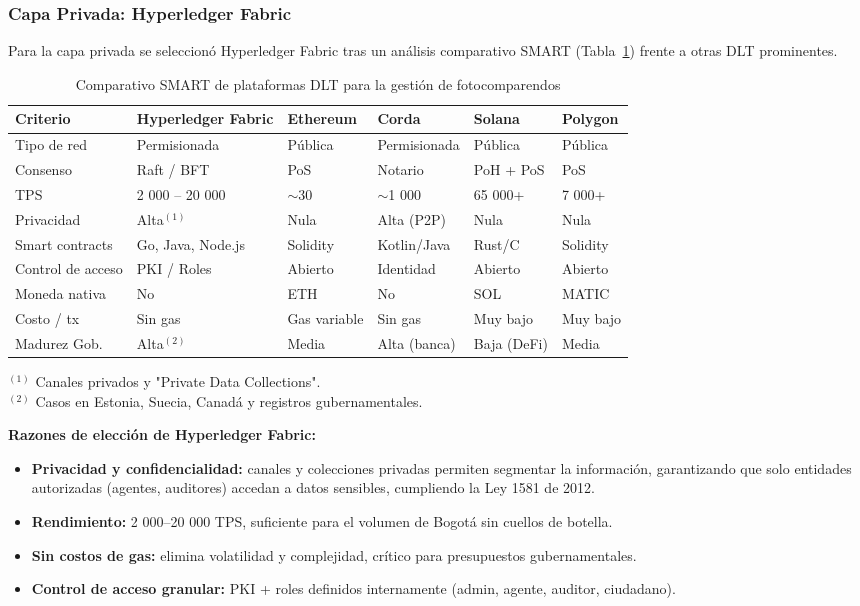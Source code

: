 \subsubsection{Capa Privada: Hyperledger Fabric}

Para la capa privada se seleccionó Hyperledger Fabric tras un análisis comparativo SMART (Tabla~\ref{tab:dlt_smart}) frente a otras DLT prominentes.

\begin{table}[H]
\centering
\small
\caption{Comparativo SMART de plataformas DLT para la gestión de fotocomparendos}
\begin{tabular}{p{2.4cm}p{2.2cm}p{2cm}p{2cm}p{2cm}p{2cm}}
\toprule
\textbf{Criterio} & \textbf{Hyperledger Fabric} & \textbf{Ethereum} & \textbf{Corda} & \textbf{Solana} & \textbf{Polygon} \\
\midrule
Tipo de red & Permisionada & Pública & Permisionada & Pública & Pública \\
Consenso & Raft / BFT & PoS & Notario & PoH + PoS & PoS \\
TPS & 2 000 – 20 000 & $\sim$30 & $\sim$1 000 & 65 000+ & 7 000+ \\
Privacidad & Alta$^{(1)}$ & Nula & Alta (P2P) & Nula & Nula \\
Smart contracts & Go, Java, Node.js & Solidity & Kotlin/Java & Rust/C & Solidity \\
Control de acceso & PKI / Roles & Abierto & Identidad & Abierto & Abierto \\
Moneda nativa & No & ETH & No & SOL & MATIC \\
Costo / tx & Sin gas & Gas variable & Sin gas & Muy bajo & Muy bajo \\
Madurez Gob. & Alta$^{(2)}$ & Media & Alta (banca) & Baja (DeFi) & Media \\
\bottomrule
\end{tabular}
\vspace{2pt}
\footnotesize
$^{(1)}$ Canales privados y "Private Data Collections".\\
$^{(2)}$ Casos en Estonia, Suecia, Canadá y registros gubernamentales.
\label{tab:dlt_smart}
\end{table}

\textbf{Razones de elección de Hyperledger Fabric:}

\begin{itemize}
    \item \textbf{Privacidad y confidencialidad:} canales y colecciones privadas permiten segmentar la información, garantizando que solo entidades autorizadas (agentes, auditores) accedan a datos sensibles, cumpliendo la Ley 1581 de 2012.
    
    \item \textbf{Rendimiento:} 2 000–20 000 TPS, suficiente para el volumen de Bogotá sin cuellos de botella.
    
    \item \textbf{Sin costos de gas:} elimina volatilidad y complejidad, crítico para presupuestos gubernamentales.
    
    \item \textbf{Control de acceso granular:} PKI + roles definidos internamente (admin, agente, auditor, ciudadano).
\end{itemize}

